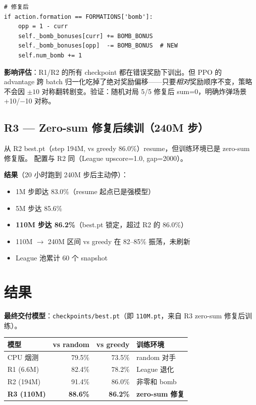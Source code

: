 \documentclass[twocolumn,a4paper,10pt]{ctexart}
\begin{document}
\begin{verbatim}
# 修复后
if action.formation == FORMATIONS['bomb']:
    opp = 1 - curr
    self._bomb_bonuses[curr] += BOMB_BONUS
    self._bomb_bonuses[opp]  -= BOMB_BONUS  # NEW
    self.num_bomb += 1
\end{verbatim}

\textbf{影响评估}：R1/R2 的所有 checkpoint 都在错误奖励下训出。但 PPO 的 advantage 跨 batch 归一化吃掉了绝对奖励偏移——只要\emph{相对}奖励顺序不变，策略不会因 $\pm10$ 对称翻转剧变。验证：随机对局 5/5 修复后 sum=0，明确炸弹场景 +10/$-$10 对称。

\subsection{R3 — Zero-sum 修复后续训（240M 步）}

从 R2 best.pt（step 194M, vs greedy 86.0\%）resume，但训练环境已是 zero-sum 修复版。
配置与 R2 同（League upscore=1.0, gap=2000）。

\textbf{结果}（20 小时跑到 240M 步后主动停）：

\begin{itemize}[nosep,leftmargin=1.2em]
  \item 1M 步即达 83.0\%（resume 起点已是强模型）
  \item 5M 步达 85.6\%
  \item \textbf{110M 步达 86.2\%}（best.pt 锁定，超过 R2 的 86.0\%）
  \item 110M $\to$ 240M 区间 vs greedy 在 82--85\% 振荡，未刷新
  \item League 池累计 60 个 snapshot
\end{itemize}

\section{结果}

\textbf{最终交付模型}：\texttt{checkpoints/best.pt}（即 \texttt{110M.pt}，来自 R3 zero-sum 修复后训练）。

{\small
\begin{tabularx}{\columnwidth}{@{}l r r X@{}}
\toprule
模型 & vs random & vs greedy & 训练环境 \\
\midrule
CPU 烟测  & 79.5\% & 73.5\% & random 对手 \\
R1 (6.6M) & 82.4\% & 78.2\% & League 退化 \\
R2 (194M) & 91.4\% & 86.0\% & \cellcolor{buggycell}非零和 bomb \\
\textbf{R3 (110M)} & \cellcolor{bestcell}\textbf{88.6\%} & \cellcolor{bestcell}\textbf{86.2\%} & \cellcolor{bestcell}\textbf{zero-sum 修复} \\
\bottomrule
\end{tabularx}}
\end{document}
